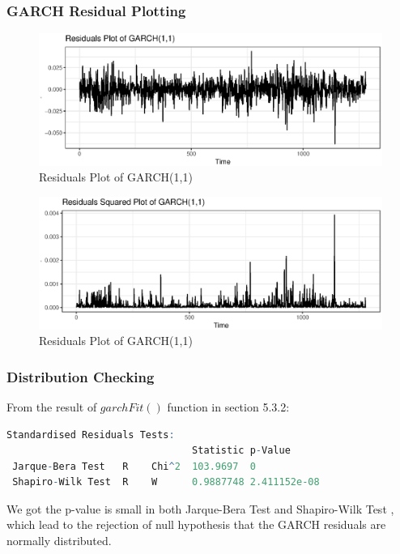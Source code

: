 \subsubsection{GARCH Residual Plotting}
\FloatBarrier
\begin{figure}[!htbp]
  \centering
  \includegraphics[width=\textwidth]{img/Fig17.eps}
  \caption{Residuals Plot of GARCH(1,1)}
\end{figure}
\FloatBarrier
\FloatBarrier
\begin{figure}[!htbp]
  \centering
  \includegraphics[width=\textwidth]{img/Fig18.eps}
  \caption{Residuals Plot of GARCH(1,1)}
\end{figure}
\FloatBarrier
\subsubsection{Distribution Checking}
From the result of $garchFit()$ function in section 5.3.2:
\begin{lstlisting}[language=R]
Standardised Residuals Tests:
                                Statistic p-Value     
 Jarque-Bera Test   R    Chi^2  103.9697  0
 Shapiro-Wilk Test  R    W      0.9887748 2.411152e-08
\end{lstlisting}
We got the p-value is small in both Jarque-Bera Test \cite{jarque1980efficient} and Shapiro-Wilk Test \cite{royston1982extension}, which lead to the rejection of null hypothesis that the GARCH residuals are normally distributed.

